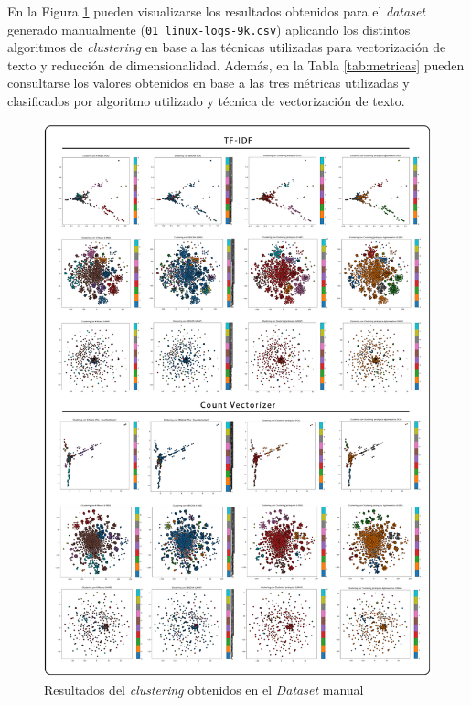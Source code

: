 En la Figura \ref{fig:resultados-dataset-manual} pueden visualizarse los resultados obtenidos para el \textit{dataset} generado manualmente (\texttt{01\_linux-logs-9k.csv}) aplicando los distintos algoritmos de \textit{clustering} en base a las técnicas utilizadas para vectorización de texto y reducción de dimensionalidad. Además, en la Tabla \ref{tab:metricas} pueden consultarse los valores obtenidos en base a las tres métricas utilizadas y clasificados por algoritmo utilizado y técnica de vectorización de texto.

\newpage
  
\noindent \hspace{-11mm}
\begin{minipage}{\linewidth}
        \begin{figure}[H]
            \centering
            \includegraphics[width=1.2\linewidth, keepaspectratio]{imagenes/graficas-dataset-manual.png}
            \caption{Resultados del \textit{clustering} obtenidos en el \textit{Dataset} manual}
            \label{fig:resultados-dataset-manual}
        \end{figure}
\end{minipage}

